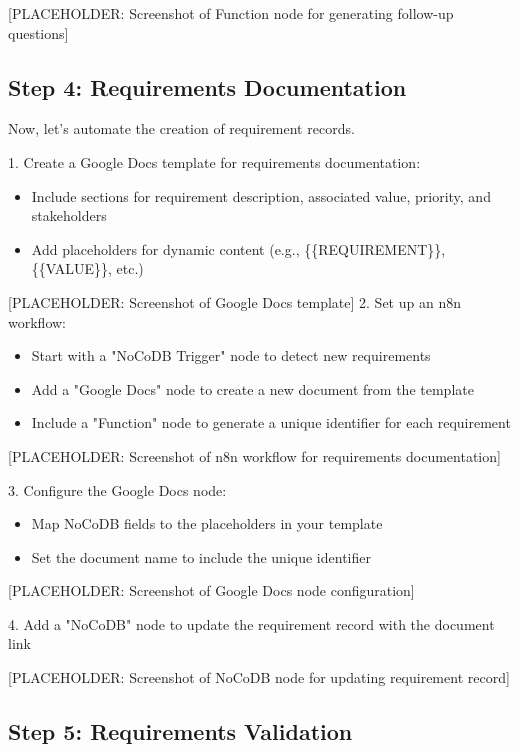 [PLACEHOLDER: Screenshot of Function node for generating follow-up questions]

\subsection{Step 4: Requirements Documentation}

Now, let's automate the creation of requirement records.

1. Create a Google Docs template for requirements documentation:
\begin{itemize}
    \item Include sections for requirement description, associated value, priority, and stakeholders
    \item Add placeholders for dynamic content (e.g., \{\{REQUIREMENT\}\}, \{\{VALUE\}\}, etc.)
\end{itemize}

[PLACEHOLDER: Screenshot of Google Docs template]
%
2. Set up an n8n workflow:
\begin{itemize}
    \item Start with a "NoCoDB Trigger" node to detect new requirements
    \item Add a "Google Docs" node to create a new document from the template
    \item Include a "Function" node to generate a unique identifier for each requirement
\end{itemize}

[PLACEHOLDER: Screenshot of n8n workflow for requirements documentation]

3. Configure the Google Docs node:
\begin{itemize}
    \item Map NoCoDB fields to the placeholders in your template
    \item Set the document name to include the unique identifier
\end{itemize}

[PLACEHOLDER: Screenshot of Google Docs node configuration]

4. Add a "NoCoDB" node to update the requirement record with the document link

[PLACEHOLDER: Screenshot of NoCoDB node for updating requirement record]

\subsection{Step 5: Requirements Validation}

